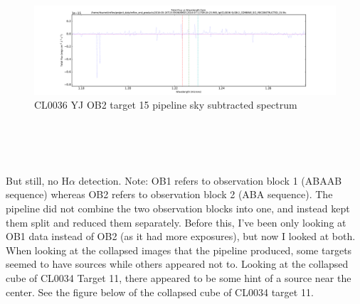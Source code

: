 \documentclass[10pt,letterpaper]{article}
\begin{document}
\begin{figure}[h!]
\caption{CL0036 YJ OB2 target 15 pipeline sky subtracted spectrum}\label{fig:CL0036 YJ OB2 target 15 pipeline sky subtracted spectrum}
\includegraphics[scale=0.4]{figures/CL0036-YJ-OB-2_COMBINE_SCI_RECONSTRUCTED_15.pdf}
\end{figure}
\hspace{1cm} \\
\hspace{1cm} \\
\hspace{1cm} \\
\newpage

But still, no H$\alpha$ detection. Note: OB1 refers to observation block 1 (ABAAB sequence) whereas OB2 refers to observation block 2 (ABA sequence). The pipeline did not combine the two observation blocks into one, and instead kept them split and reduced them separately. Before this, I've been only looking at OB1 data instead of OB2 (as it had more exposures), but now I looked at both.\\

When looking at the collapsed images that the pipeline produced, some targets seemed to have sources while others appeared not to. Looking at the collapsed cube of CL0034 Target 11, there appeared to be some hint of a source near the center. See the figure below of the collapsed cube of CL0034 target 11.\\
\end{document}
